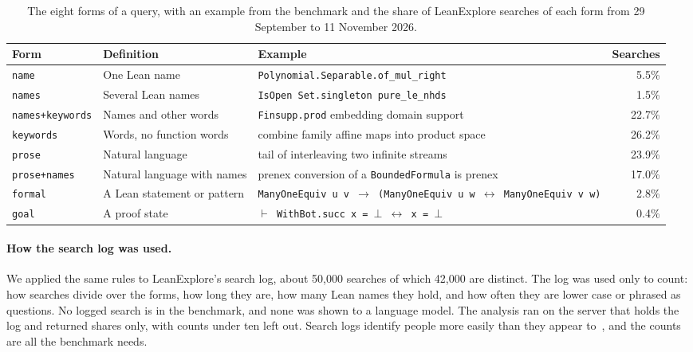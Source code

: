 \documentclass{article}
\newcommand{\thead}[1]{\textbf{#1}}
\newcommand{\rowrule}{\arrayrulecolor{nBorderLight}\specialrule{0.4pt}{3pt}{3pt}\arrayrulecolor{nBorder}}
\newcommand{\code}[1]{\texttt{\small #1}}
\begin{document}
\begin{table}[b]
\centering\small
\caption{The eight forms of a query, with an example from the benchmark and
the share of LeanExplore searches of each form from 29 September to 11
November 2026.}
\label{tab:forms}
\begin{tabularx}{\linewidth}{@{}llXr@{}}
\toprule
\thead{Form} & \thead{Definition} & \thead{Example} & \thead{Searches} \\
\midrule
\code{name} & One Lean name & \code{Polynomial.Separable.of\_mul\_right} & 5.5\% \\
\rowrule
\code{names} & Several Lean names & \code{IsOpen Set.singleton pure\_le\_nhds} & 1.5\% \\
\rowrule
\code{names+keywords} & Names and other words & \code{Finsupp.prod} embedding domain support & 22.7\% \\
\rowrule
\code{keywords} & Words, no function words & combine family affine maps into product space & 26.2\% \\
\rowrule
\code{prose} & Natural language & tail of interleaving two infinite streams & 23.9\% \\
\rowrule
\code{prose+names} & Natural language with names & prenex conversion of a \code{BoundedFormula} is prenex & 17.0\% \\
\rowrule
\code{formal} & A Lean statement or pattern & \code{ManyOneEquiv u v $\to$ (ManyOneEquiv u w $\leftrightarrow$ ManyOneEquiv v w)} & 2.8\% \\
\rowrule
\code{goal} & A proof state & \code{$\vdash$ WithBot.succ x = $\bot$ $\leftrightarrow$ x = $\bot$} & 0.4\% \\
\bottomrule
\end{tabularx}
\end{table}

\paragraph{How the search log was used.} We applied the same rules to
LeanExplore's search log, about 50,000 searches of which 42,000 are distinct.
The log was used only to count: how searches divide over the forms, how long
they are, how many Lean names they hold, and how often they are lower case or
phrased as questions. No logged search is in the benchmark, and none was shown
to a language model. The analysis ran on the server that holds the log and
returned shares only, with counts under ten left out. Search logs identify
people more easily than they appear to~\cite{barbaro2006aol}, and the counts
are all the benchmark needs.
\end{document}
